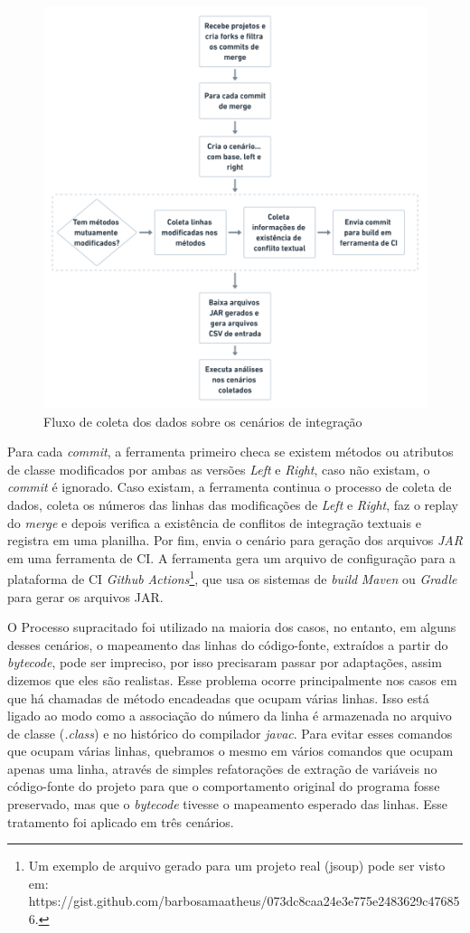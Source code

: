 \begin{figure}[!h]
    \centering
    \includegraphics[width=0.8\linewidth]{samples/images/Fluxo de mineracao.png}
    \caption{Fluxo de coleta dos dados sobre os cenários de integração}
    \label{fig:mineracao}
\end{figure}

Para cada \emph{commit}, a ferramenta primeiro checa se existem métodos ou atributos de classe modificados por ambas as versões \emph{Left} e \emph{Right}, caso não existam, o \emph{commit} é ignorado. Caso existam, a ferramenta continua o processo de coleta de dados, coleta os números das linhas das modificações de \emph{Left} e \emph{Right}, faz o replay do \emph{merge} e depois verifica a existência de conflitos de integração textuais e registra em uma planilha. Por fim, envia o cenário para geração dos arquivos \emph{JAR} em uma ferramenta de CI. A ferramenta gera um arquivo de configuração para a plataforma de CI \emph{Github Actions}\footnote{Um exemplo de arquivo gerado para um projeto real (jsoup) pode ser visto em: https://gist.github.com/barbosamaatheus/073dc8caa24e3e775e2483629c476856.
}, que usa os sistemas de \emph{build} \emph{Maven} ou \emph{Gradle} para gerar os arquivos JAR.


O Processo supracitado foi utilizado na maioria dos casos, no entanto, em alguns desses cenários, o mapeamento das linhas do código-fonte, extraídos a partir do \emph{bytecode}, pode ser impreciso, por isso precisaram passar por adaptações, assim dizemos que eles são realistas. Esse problema ocorre principalmente nos casos em que há chamadas de método encadeadas que ocupam várias linhas. Isso está ligado ao modo como a associação do número da linha é armazenada no arquivo de classe (\emph{.class}) e no histórico do compilador \emph{javac}. Para evitar esses comandos que ocupam várias linhas, quebramos o mesmo em vários comandos que ocupam apenas uma linha, através de simples refatorações de extração de variáveis no código-fonte do projeto para que o comportamento original do programa fosse preservado, mas que o \emph{bytecode} tivesse o mapeamento esperado das linhas. Esse tratamento foi aplicado em três cenários.

